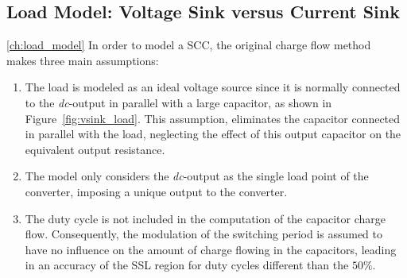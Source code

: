 \subsection{Load Model: Voltage Sink versus Current Sink}
\ref{ch:load_model}
In order to model a SCC, the original charge flow method~\cite{95Makowski} makes three main assumptions:
\begin{enumerate}
  \item The load is modeled as an ideal voltage source since it is normally connected to the \emph{dc}-output in parallel with a large capacitor, as shown in Figure~\ref{fig:vsink_load}. This assumption, eliminates the capacitor connected in parallel with the load, neglecting the effect of this output capacitor on the equivalent output resistance.

  \item The model only considers the \emph{dc}-output as the single load point of the converter, imposing a unique output to the converter.

  \item The duty cycle is not included in the computation of the capacitor charge flow. Consequently, the modulation of the switching period is assumed to have no influence on the amount of charge flowing in the capacitors, leading in an accuracy of the SSL region for duty cycles different than the $50\%$.
\end{enumerate}

